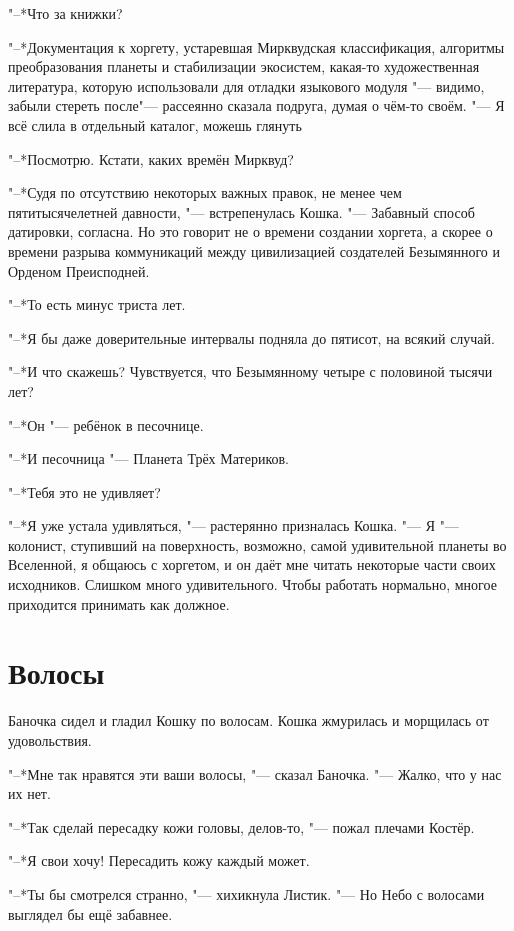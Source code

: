 \documentclass[a4paper,10pt]{book}
\newcommand{\ldotst}{\so{...}\xspace}
\begin{document}
"--*Что за книжки?

"--*Документация к хоргету, устаревшая Мирквудская классификация, алгоритмы преобразования планеты и стабилизации экосистем, какая-то художественная литература, которую использовали для отладки языкового модуля "--- видимо, забыли стереть после\ldotst "--- рассеянно сказала подруга, думая о чём-то своём. "--- Я всё слила в отдельный каталог, можешь глянуть\ldotst

"--*Посмотрю. Кстати, каких времён Мирквуд?

"--*Судя по отсутствию некоторых важных правок, не менее чем пятитысячелетней давности, "--- встрепенулась Кошка. "--- Забавный способ датировки, согласна. Но это говорит не о времени создании хоргета, а скорее о времени разрыва коммуникаций между цивилизацией создателей Безымянного и Орденом Преисподней.

"--*То есть минус триста лет.

"--*Я бы даже доверительные интервалы подняла до пятисот, на всякий случай.

"--*И что скажешь? Чувствуется, что Безымянному четыре с половиной тысячи лет?

"--*Он "--- ребёнок в песочнице.

"--*И песочница "--- Планета Трёх Материков.
 
"--*Тебя это не удивляет?

"--*Я уже устала удивляться, "--- растерянно призналась Кошка.
"--- Я "--- колонист, ступивший на поверхность, возможно, самой удивительной планеты во Вселенной, я общаюсь с хоргетом, и он даёт мне читать некоторые части своих исходников.
Слишком много удивительного.
Чтобы работать нормально, многое приходится принимать как должное.

 \section{Волосы}

 Баночка сидел и гладил Кошку по волосам. Кошка жмурилась и морщилась от удовольствия.

"--*Мне так нравятся эти ваши волосы, "--- сказал Баночка. "--- Жалко, что у нас их нет.

"--*Так сделай пересадку кожи головы, делов-то, "--- пожал плечами Костёр.

"--*Я свои хочу! Пересадить кожу каждый может.

"--*Ты бы смотрелся странно, "--- хихикнула Листик. "--- Но Небо с волосами выглядел бы ещё забавнее.
\end{document}
